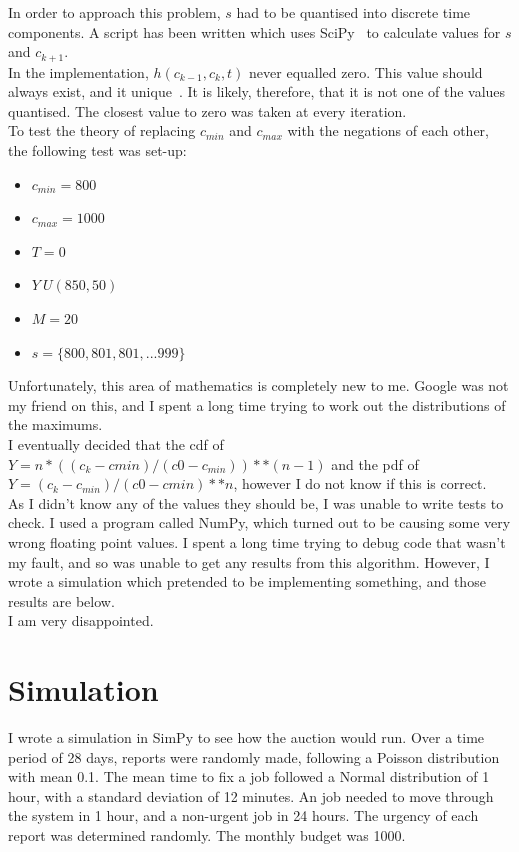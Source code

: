 In order to approach this problem, $s$ had to be quantised into discrete time components. A script has been written which uses SciPy~\cite{scipy} to calculate values for $s$ and $c_{k+1}$. \\

In the implementation, $h(c_{k-1}, c_k, t)$ never equalled zero. This value should always exist, and it unique~\cite{dutch}. It is likely, therefore, that it is not one of the values quantised. The closest value to zero was taken at every iteration. \\

To test the theory of replacing $c_{min}$ and $c_{max}$ with the negations of each other, the following test was set-up:
\begin{itemize}
\item $c_{min} = 800$
\item $c_{max} = 1000$
\item $T = 0$
\item $Y~U(850, 50)$
\item $M = 20$
\item $s = \{800, 801, 801,...999\}$
\end{itemize}

Unfortunately, this area of mathematics is completely new to me. Google was not my friend on this, and I spent a long time trying to work out the distributions of the maximums. \\

I eventually decided that the cdf of $Y = n*((c_{k}-cmin) / (c0 - c_{min}))**(n-1)$ and the pdf of $Y = (c_k-c_{min}) / (c0 - cmin)**n$, however I do not know if this is correct. \\

As I didn't know any of the values they should be, I was unable to write tests to check. I used a program called NumPy, which turned out to be causing some very wrong floating point values. I spent a long time trying to debug code that wasn't my fault, and so was unable to get any results from this algorithm. However, I wrote a simulation which pretended to be implementing something, and those results are below. \\

I am very disappointed.

\section{Simulation}
I wrote a simulation in SimPy to see how the auction would run. Over a time period of 28 days, reports were randomly made, following a Poisson distribution with mean 0.1. The mean time to fix a job followed a Normal distribution of 1 hour, with a standard deviation of 12 minutes. An job needed to move through the system in 1 hour, and a non-urgent job in 24 hours. The urgency of each report was determined randomly. The monthly budget was 1000. \\

